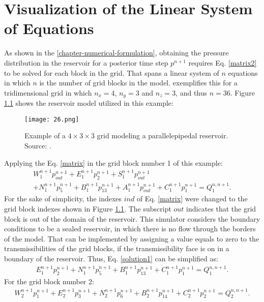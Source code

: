 \chapter{Visualization of the Linear System of Equations}
\label{appendices_vis}

As shown in the \autoref{chapter-numerical-formulation}, obtaining the pressure distribution in the reservoir for a posterior time step $p^{n+1}$ requires Eq. \ref{matrix2} to be solved for each block in the grid. That spans a linear system of $n$ equations in which $n$ is the number of grid blocks in the model. \cite{Ertekin2001} exemplifies this for a tridimensional grid in which $n_x = 4$, $n_y = 3$ and $n_z = 3$, and thus $n = 36$. Figure \ref{fig:26} shows the reservoir model utilized in this example:
\begin{figure}[H]
	\centering
	\texttt{[image: 26.png]}\\
	\caption{Example of a $4 \times 3 \times 3$ grid modeling a parallelepipedal reservoir. Source: \cite{Ertekin2001}.}
	\label{fig:26}
\end{figure}
\noindent
Applying the Eq. \ref{matrix} in the grid block number 1 of this example:
\begin{multline}
\label{solution1}
W^{n+1}_{1}p^{n+1}_{out}+E^{n+1}_{1}p^{n+1}_{2}+S^{n+1}_{1}p^{n+1}_{out}\\+N^{n+1}_{1}p^{n+1}_{5}+B^{n+1}_{1}p^{n+1}_{13}+A^{n+1}_{1}p^{n+1}_{out}+C^{n+1}_{1}p^{n+1}_{1}=Q^{n, n+1}_{1}.
\end{multline}
For the sake of simplicity, the indexes $ind$ of Eq. \ref{matrix} were changed to the grid block indexes shown in Figure \ref{fig:26}. The subscript $out$ indicates that the grid block is out of the domain of the reservoir. This simulator considers the boundary conditions to be a sealed reservoir, in which there is no flow through the borders of the model. That can be implemented by assigning a value equals to zero to the transmissibilities of the grid blocks, if the transmissibility face is on in a boundary of the reservoir. Thus, Eq. \ref{solution1} can be simplified as:
\begin{multline}
\label{solution2}
E^{n+1}_{1}p^{n+1}_{2}+N^{n+1}_{1}p^{n+1}_{5}+B^{n+1}_{1}p^{n+1}_{13}+C^{n+1}_{1}p^{n+1}_{1}=Q^{n, n+1}_{1}.
\end{multline}
For the grid block number 2:
\begin{multline}
\label{solution3}
W^{n+1}_{2}p^{n+1}_{1}+E^{n+1}_{2}p^{n+1}_{3}+N^{n+1}_{2}p^{n+1}_{6}+B^{n+1}_{2}p^{n+1}_{14}+C^{n+1}_{2}p^{n+1}_{2}=Q^{n, n+1}_{2}.
\end{multline}
